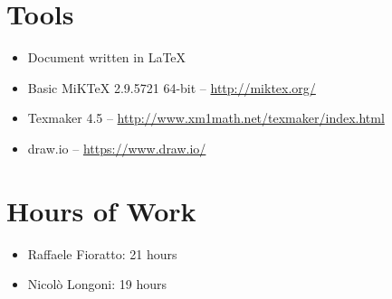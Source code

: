 \newpage
\begin{appendices}
\section{Tools}
\begin{itemize}
	\item Document written in \LaTeX
	\item Basic MiKTeX 2.9.5721 64-bit -- \url{http://miktex.org/}
	\item Texmaker 4.5 -- \url{http://www.xm1math.net/texmaker/index.html}
	\item draw.io -- \url{https://www.draw.io/}
\end{itemize}
\break
\section{Hours of Work}
\begin{itemize}
	\item Raffaele Fioratto: 21 hours	
	\item Nicol\`{o} Longoni: 19 hours
\end{itemize}
\end{appendices}